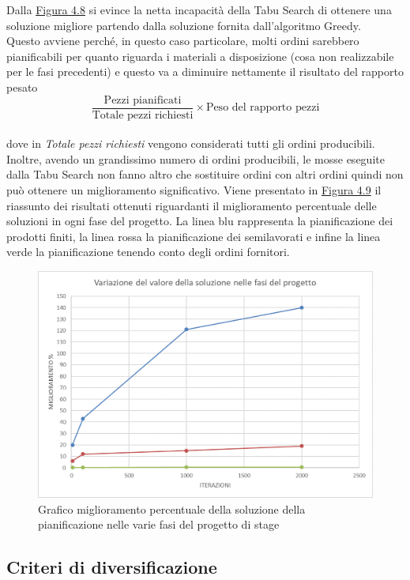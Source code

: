 Dalla \hyperref[4.8]{Figura 4.8} si evince la netta incapacità della Tabu Search di ottenere una soluzione migliore partendo dalla soluzione fornita dall'algoritmo Greedy.\\
Questo avviene perché, in questo caso particolare, molti ordini sarebbero pianificabili per quanto riguarda i materiali a disposizione (cosa non realizzabile per le fasi
precedenti) e questo va a diminuire nettamente il risultato del rapporto pesato \[\frac{\text{Pezzi pianificati}}{\text{Totale pezzi richiesti}} \times \text{Peso del rapporto pezzi}\]\\
dove in \textit{Totale pezzi richiesti} vengono considerati tutti gli ordini producibili.\\ Inoltre, avendo un grandissimo numero di ordini producibili, le mosse eseguite 
dalla Tabu Search non fanno altro che sostituire ordini con altri ordini quindi non può ottenere un miglioramento significativo. Viene presentato in \hyperref[4.9]{Figura 4.9} 
il riassunto dei risultati ottenuti riguardanti il miglioramento percentuale delle soluzioni in ogni fase del progetto. La linea blu rappresenta la pianificazione dei prodotti finiti,
 la linea rossa la pianificazione dei semilavorati e infine la linea verde la pianificazione tenendo conto degli ordini fornitori. 

\begin{figure}[H]
	\includegraphics[width=13cm]{immagini/graficofi.png}
	\centering
    \caption{Grafico miglioramento percentuale della soluzione della pianificazione nelle varie fasi del progetto di stage}
    \label{4.9}
\end{figure}

\newpage
\subsection{Criteri di diversificazione}

